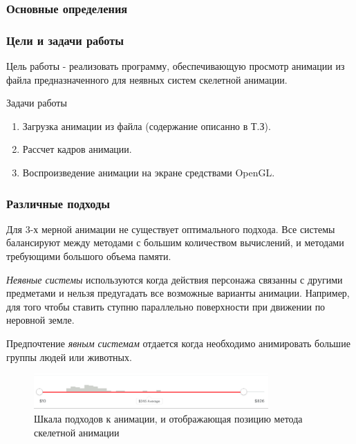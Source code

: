 \documentclass{beamer}
\begin{document}
\begin{frame}
\frametitle{Основные определения}
    
\end{frame}


\begin{frame}
\frametitle{Цели и задачи работы}
    Цель работы - реализовать программу, обеспечивающую просмотр анимации из файла предназначенного для неявных систем скелетной анимации.
    
    \bigskip
    
    Задачи работы
    
    \smallskip
	\begin{enumerate}
	\item Загрузка анимации из файла (содержание описанно в Т.З).
	\item Рассчет кадров анимации.
	\item Воспроизведение анимации на экране средствами OpenGL.
	\end{enumerate}
    
\end{frame}



\begin{frame}
\frametitle{Различные подходы}
\begin{small}
    Для 3-х мерной анимации не существует оптимального подхода. Все системы балансируют между методами с большим количеством вычислений, и методами требующими большого объема памяти.
    
    \medskip
    \emph{Неявные системы} используются когда действия персонажа связанны с другими предметами и нельзя предугадать все возможные варианты анимации. Например, для того чтобы ставить ступню параллельно поверхности при движении по неровной земле.
    
    \smallskip
    Предпочтение \emph{явным системам} отдается когда необходимо анимировать большие группы людей или животных.
    
\begin{figure}[h!]
    \centering
    \includegraphics[width=0.8\textwidth]{raw_graph_cpu_vs_ram.png}
    \caption{Шкала подходов к анимации, и отображающая позицию метода скелетной анимации}
\end{figure}

\end{small}
\end{frame}
\end{document}
